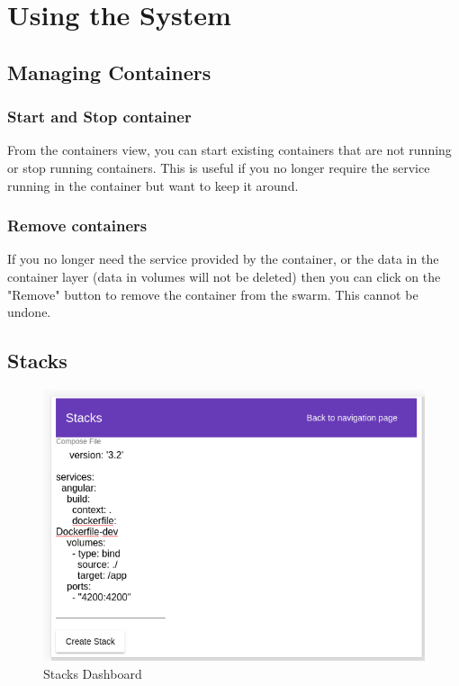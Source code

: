 \documentclass[]{article}
\begin{document}
\section{Using the System}
\subsection{Managing Containers}
\subsubsection{Start and Stop container}
From the containers view, you can start existing containers that are not running
or stop running containers. This is useful if you no longer require the service running in the container but want to keep it around.

\subsubsection{Remove containers}
If you no longer need the service provided by the container, or the data in the container layer (data in volumes will not be deleted) then you can click on the "Remove" button to remove the container from the swarm. This cannot be undone.

\subsection{Stacks}
\begin{figure}[H]
	\centering
	\includegraphics[scale=0.5]{manual_stacks.png}
	\caption{Stacks Dashboard}
\end{figure}
\end{document}
